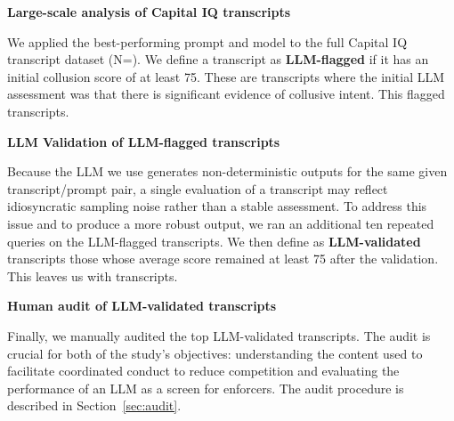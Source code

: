 \textbf{Large-scale analysis of Capital IQ transcripts}


We applied the best-performing prompt and model to the full 
Capital IQ transcript dataset (N=). 
We define a transcript as {\textbf{LLM-flagged}} if it has an initial 
collusion score of at least 75. These are transcripts where the initial 
LLM assessment was that there is significant evidence of collusive intent. 
This flagged  transcripts.

\textbf{LLM Validation of LLM-flagged transcripts}


Because the LLM we use generates non-deterministic outputs for the same 
given transcript/prompt pair, a single evaluation of a transcript may 
reflect idiosyncratic sampling noise rather than a stable assessment. 
To address this issue and to produce a more robust output, we ran an 
additional ten repeated queries on the LLM-flagged transcripts. We then 
define as {\textbf{LLM-validated}} transcripts those whose average 
score remained at least 75 after the validation. This leaves us with
  transcripts.

\textbf{Human audit of LLM-validated transcripts}


Finally, we manually audited the top  
LLM-validated transcripts. The audit is crucial for both of the study's objectives: 
understanding the content used to facilitate coordinated conduct to reduce 
competition and evaluating the performance of an LLM as a screen for enforcers.
 The audit procedure is described in Section~\ref{sec:audit}.

